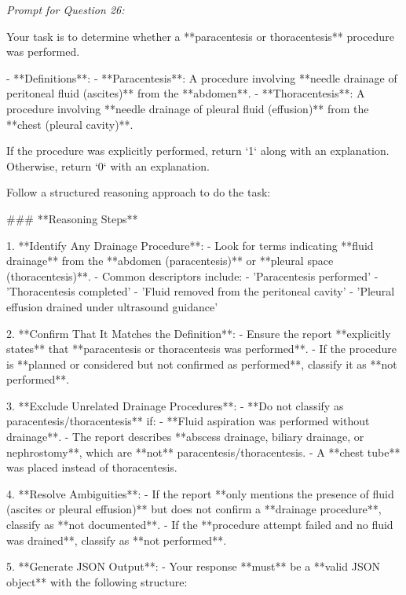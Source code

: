 \textit{\normalsize Prompt for Question  26:}
\begin{mdframed}[]
\normalsize

Your task is to determine whether a **paracentesis or thoracentesis** procedure was performed.  

- **Definitions**:  
  - **Paracentesis**: A procedure involving **needle drainage of peritoneal fluid (ascites)** from the **abdomen**.  
  - **Thoracentesis**: A procedure involving **needle drainage of pleural fluid (effusion)** from the **chest (pleural cavity)**.  

If the procedure was explicitly performed, return `1` along with an explanation. Otherwise, return `0` with an explanation.

Follow a structured reasoning approach to do the task:

### **Reasoning Steps**  

1. **Identify Any Drainage Procedure**:  
   - Look for terms indicating **fluid drainage** from the **abdomen (paracentesis)** or **pleural space (thoracentesis)**.  
   - Common descriptors include:  
     - 'Paracentesis performed'  
     - 'Thoracentesis completed'  
     - 'Fluid removed from the peritoneal cavity'  
     - 'Pleural effusion drained under ultrasound guidance'  

2. **Confirm That It Matches the Definition**:  
   - Ensure the report **explicitly states** that **paracentesis or thoracentesis was performed**.  
   - If the procedure is **planned or considered but not confirmed as performed**, classify it as **not performed**.  

3. **Exclude Unrelated Drainage Procedures**:  
   - **Do not classify as paracentesis/thoracentesis** if:  
     - **Fluid aspiration was performed without drainage**.  
     - The report describes **abscess drainage, biliary drainage, or nephrostomy**, which are **not** paracentesis/thoracentesis.  
     - A **chest tube** was placed instead of thoracentesis.  

4. **Resolve Ambiguities**:  
   - If the report **only mentions the presence of fluid (ascites or pleural effusion)** but does not confirm a **drainage procedure**, classify as **not documented**.  
   - If the **procedure attempt failed and no fluid was drained**, classify as **not performed**.  

5. **Generate JSON Output**:  
   - Your response **must** be a **valid JSON object** with the following structure:  

\end{mdframed}

